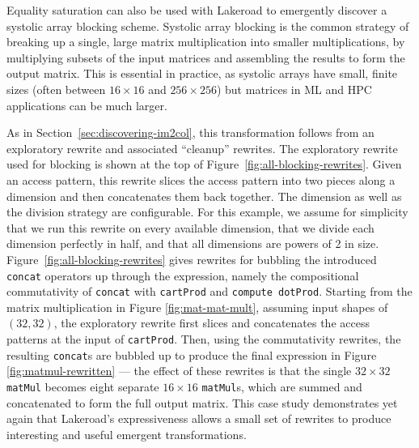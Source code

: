 \documentclass[prologue, dvipsnames, sigplan, screen, review, anonymous]{acmart}
\newcommand{\g}{Lakeroad\xspace}
\newcommand{\tcd}[1]{\texttt{#1}}
\begin{document}
Equality saturation 
  can also be used with \g 
  to emergently discover a
  systolic array
  blocking scheme.
Systolic array blocking
  is the common strategy
  of breaking up a single, large
  matrix multiplication
  into smaller multiplications,
  by multiplying subsets
  of the input matrices
  and assembling the results
  to form the output matrix.
This is essential in practice,
  as systolic arrays have small, finite sizes
  (often between $16\times16$ and $256\times256$)
  but matrices in ML and HPC applications
  can be much larger.

As in Section~\ref{sec:discovering-im2col},
  this transformation follows
  from an exploratory rewrite
  and associated ``cleanup'' rewrites.
The exploratory rewrite used for blocking
  is shown at the top of Figure~\ref{fig:all-blocking-rewrites}.
Given an access pattern,
  this rewrite slices the access pattern
  into two pieces
  along a dimension
  and then concatenates them back together.
The dimension
  as well as the division strategy
  are configurable.
For this example,
  we assume for simplicity
  that we run this rewrite
  on every available dimension,
  that we divide each dimension
  perfectly in half,
  and that all dimensions are powers of 2 in size.
Figure~\ref{fig:all-blocking-rewrites} gives rewrites
  for bubbling the introduced
  \texttt{concat}
  operators up through the expression,
  namely the compositional commutativity
  of \tcd{concat}
  with \tcd{cartProd}
  and \tcd{compute dotProd}.
Starting from the matrix multiplication
  in Figure \ref{fig:mat-mat-mult},
  assuming input shapes of $(32,32)$,
  the exploratory rewrite first slices and concatenates
  the access patterns
  at the input of \tcd{cartProd}.
Then, using the commutativity rewrites,
  the resulting \tcd{concat}s
  are bubbled up
  to produce the final expression
  in Figure \ref{fig:matmul-rewritten} --- the effect of these rewrites
  is that the single 
  $32\times 32$ \tcd{matMul}
  becomes eight separate $16\times 16$ \tcd{matMul}s,
  which are
  summed
  and concatenated
  to form the full output matrix.
This case study demonstrates
  yet again
  that \g's expressiveness
  allows a small set
  of rewrites
  to produce interesting and useful
  emergent transformations.
  
\end{document}
